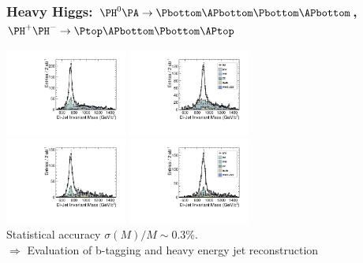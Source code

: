 \documentclass{beamer}
\begin{document}
\begin{frame}
\frametitle{Heavy Higgs: $\PH^0\PA\to\Pbottom\APbottom\Pbottom\APbottom$,
$\PH^+\PH^-\to\Ptop\APbottom\Pbottom\APtop$}
\centering
\includegraphics[width=4cm]{../SIDWorkshop/HAMass742_Bkg_CKFM_00BX_FJ.pdf}
\includegraphics[width=4cm]{../SIDWorkshop/HAMass902_Bkg_CKFM_00BX_FJ.pdf}\\
\includegraphics[width=4cm]{../SIDWorkshop/Hpm_Mass742_Bkg_CKFM_00BX_FJ.pdf}
\includegraphics[width=4cm]{../SIDWorkshop/Hpm_Mass902_Bkg_CKFM_00BX_FJ.pdf}\\
{\scriptsize Statistical accuracy $\sigma(M)/M \sim0.3\%$.}\\
$\Rightarrow$ Evaluation of \alert{b-tagging and heavy energy jet
reconstruction}
\end{frame}
\end{document}
